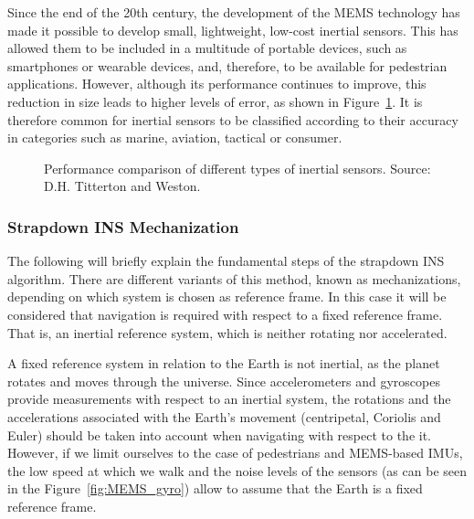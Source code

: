 \begin{description}
	Since the end of the 20th century, the development of the MEMS technology has made it possible to develop small, lightweight, low-cost inertial sensors. 
	This has allowed them to be included in a multitude of portable devices, such as smartphones or wearable devices, and, therefore, to be available for pedestrian applications.
	However, although its performance continues to improve, this reduction in size leads to higher levels of error, as shown in Figure~\ref{fig:MEMS_performance}.	
	It is therefore common for inertial sensors to be classified according to their accuracy in categories such as marine, aviation, tactical or consumer.			
	\begin{figure}[!t]
		\centering
		\vfil
	    \caption[Performance comparison of different types of inertial sensors]{Performance comparison of different types of inertial sensors. Source: D.H. Titterton and Weston\cite{titterton_strapdown_2004}.}
		\label{fig:MEMS_performance}
	\end{figure}	
\end{description}

\subsubsection{Strapdown INS Mechanization}
\label{sec:2_3_1_2_DR_INS_SINS}
The following will briefly explain the fundamental steps of the strapdown INS algorithm. 
There are different variants of this method, known as mechanizations, depending on which system is chosen as reference frame.
In this case it will be considered that navigation is required with respect to a fixed reference frame. That is, an inertial reference system, which is neither rotating nor accelerated.

A fixed reference system in relation to the Earth is not inertial, as the planet rotates and moves through the universe.
Since accelerometers and gyroscopes provide measurements with respect to an inertial system, the rotations and the accelerations associated with the Earth's movement (centripetal, Coriolis and Euler) should be taken into account when navigating with respect to the it.
However, if we limit ourselves to the case of pedestrians and MEMS-based IMUs, the low speed at which we walk and the noise levels of the sensors (as can be seen in the Figure~\ref{fig:MEMS_gyro}) allow to assume that the Earth is a fixed reference frame.

